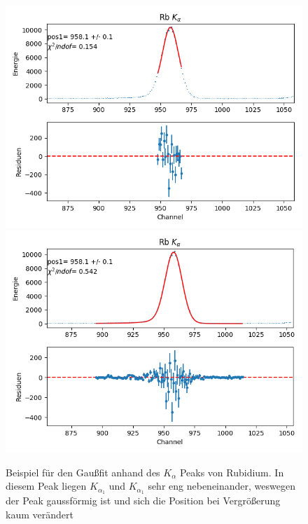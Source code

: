 \documentclass[12pt,a4paper]{article}
\begin{document}
\begin{figure}
\centering
\includegraphics[scale=0.8]{Bilder/alpha/rb_alpha_1.png}
\includegraphics[scale=0.8]{Bilder/alpha/rb_alpha_2.png}
\caption{Beispiel für den Gaußfit anhand des $K_{\alpha}$ Peaks von Rubidium. In diesem Peak liegen $K_{\alpha_1}$ und $K_{\alpha_1}$ sehr eng nebeneinander, weswegen der Peak gaussförmig ist und sich die Position bei Vergrößerung kaum verändert}
\label{fig:kal_fits}
\end{figure}
\end{document}
